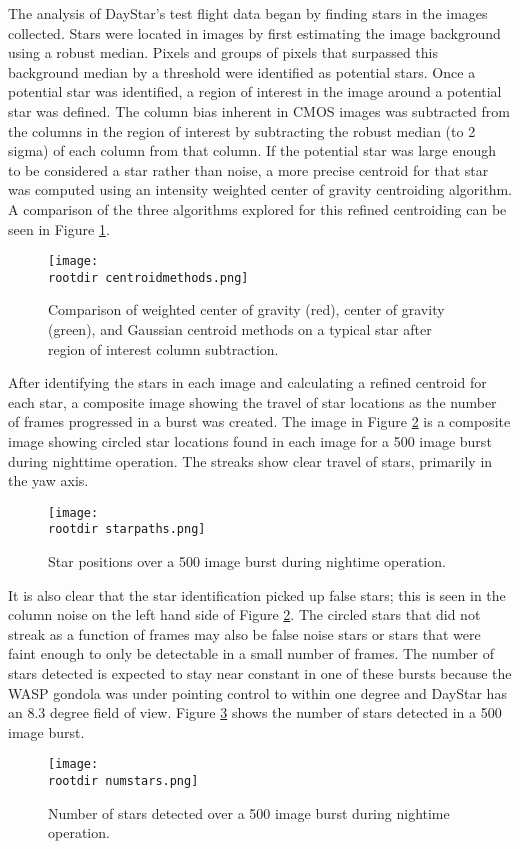\documentclass[twocolumn,letterpaper]{IEEEAerospace2012}
\newcommand{\rootdir}{./Figures/}
\begin{document}
The analysis of DayStar's test flight data began by finding stars in the images collected. Stars were located in images by first estimating the image background using a robust median. Pixels and groups of pixels that surpassed this background median by a threshold were identified as potential stars. Once a potential star was identified, a region of interest in the image around a potential star was defined. The column bias inherent in CMOS images was subtracted from the columns in the region of interest by subtracting the robust median (to 2 sigma) of each column from that column. If the potential star was large enough to be considered a star rather than noise, a more precise centroid for that star was computed using an intensity weighted center of gravity centroiding algorithm. A comparison of the three algorithms explored for this refined centroiding can be seen in Figure \ref{fig:centroidmethods}. 
\begin{figure}[H]
    \centering
    \texttt{[image: \\rootdir centroidmethods.png]}
    \caption{Comparison of weighted center of gravity (red), center of gravity (green), and Gaussian centroid methods on a typical star after region of interest column subtraction.}
    \label{fig:centroidmethods}
\end{figure}

After identifying the stars in each image and calculating a refined centroid for each star, a composite image showing the travel of star locations as the number of frames progressed in a burst was created. The image in Figure \ref{fig:starpaths} is a composite image showing circled star locations found in each image for a 500 image burst during nighttime operation. The streaks show clear travel of stars, primarily in the yaw axis.
\begin{figure}[H]
    \centering
    \texttt{[image: \\rootdir starpaths.png]}
    \caption{Star positions over a 500 image burst during nightime operation.}
    \label{fig:starpaths}
\end{figure}

It is also clear that the star identification picked up false stars; this is seen in the column noise on the left hand side of Figure \ref{fig:starpaths}. The circled stars that did not streak as a function of frames may also be false noise stars or stars that were faint enough to only be detectable in a small number of frames. The number of stars detected is expected to stay near constant in one of these bursts because the WASP gondola was under pointing control to within one degree and DayStar has an 8.3 degree field of view. Figure \ref{fig:numstars} shows the number of stars detected in a 500 image burst.
\begin{figure}
    \centering
    \texttt{[image: \\rootdir numstars.png]}
    \caption{Number of stars detected over a 500 image burst during nightime operation.}
    \label{fig:numstars}
\end{figure}
\end{document}
